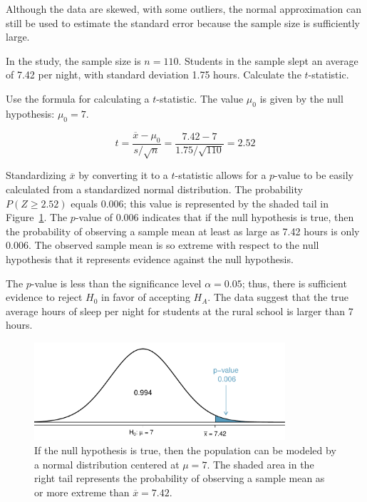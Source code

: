 \begin{spacing}{1.5}
Although the data are skewed, with some outliers, the normal approximation can still be used to estimate the standard error because the sample size is sufficiently large. 

\begin{example}{In the study, the sample size is $n = 110$. Students in the sample slept an average of 7.42 per night, with standard deviation 1.75 hours. Calculate the $t$-statistic.}
		
Use the formula for calculating a $t$-statistic. The value $\mu_{0}$ is given by the null hypothesis: $\mu_{0} = 7$. 

\[t=\frac{\overline{x}-\mu_0}{s/\sqrt{n}} = \frac{7.42 - 7}{1.75 / \sqrt{110}} = 2.52\]

\end{example}

Standardizing $\overline{x}$ by converting it to a $t$-statistic allows for a $p$-value to be easily calculated from a standardized normal distribution. The probability $P(Z \geq 2.52)$ equals 0.006; this value is represented by the shaded tail in Figure~\ref{pValueOneSidedSleepStudy}. The $p$-value of 0.006 indicates that if the null hypothesis is true, then the probability of observing a sample mean at least as large as 7.42 hours is only 0.006. The observed sample mean is so extreme with respect to the null hypothesis that it represents evidence against the null hypothesis.

The $p$-value is less than the significance level $\alpha = 0.05$; thus, there is sufficient evidence to reject $H_0$ in favor of accepting $H_A$. The data suggest that the true average hours of sleep per night for students at the rural school is larger than 7 hours. 

\begin{figure}[hht]
	\centering
	\includegraphics[width=0.83\textwidth]{ch_inference_foundations_oi_biostat/figures/pValueOneSidedSleepStudy/pValueOneSidedSleepStudy}
	\caption{If the null hypothesis is true, then the population can be modeled by a normal distribution centered at $\mu = 7$. The shaded area in the right tail represents the probability of observing a sample mean as or more extreme than $\overline{x} = 7.42$.} 
	\label{pValueOneSidedSleepStudy}
\end{figure}


\end{spacing}
